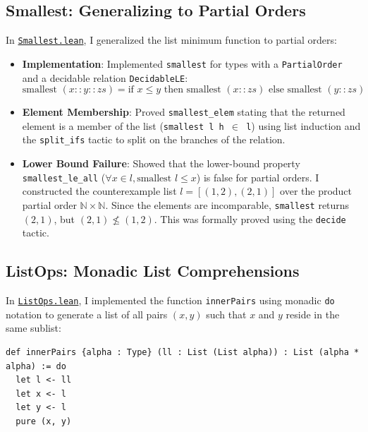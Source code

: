 \documentclass{article}
\begin{document}
\subsection{Smallest: Generalizing to Partial Orders}
In \href{file:///home/scorzion/Tech/Crypto/SKC_IITH/Day9/solutions/Smallest.lean}{\texttt{Smallest.lean}}, I generalized the list minimum function to partial orders:
\begin{itemize}
    \item \textbf{Implementation}: Implemented \texttt{smallest} for types with a \texttt{PartialOrder} and a decidable relation \texttt{DecidableLE}:
    \[
    \text{smallest } (x :: y :: zs) = \text{if } x \le y \text{ then } \text{smallest } (x :: zs) \text{ else } \text{smallest } (y :: zs)
    \]
    \item \textbf{Element Membership}: Proved \texttt{smallest\_elem} stating that the returned element is a member of the list (\texttt{smallest l h $\in$ l}) using list induction and the \texttt{split\_ifs} tactic to split on the branches of the relation.
    \item \textbf{Lower Bound Failure}: Showed that the lower-bound property \texttt{smallest\_le\_all} ($\forall x \in l, \text{smallest } l \le x$) is false for partial orders. I constructed the counterexample list $l = [(1, 2), (2, 1)]$ over the product partial order $\mathbb{N} \times \mathbb{N}$. Since the elements are incomparable, \texttt{smallest} returns $(2, 1)$, but $(2, 1) \not\le (1, 2)$. This was formally proved using the \texttt{decide} tactic.
\end{itemize}

\subsection{ListOps: Monadic List Comprehensions}
In \href{file:///home/scorzion/Tech/Crypto/SKC_IITH/Day9/solutions/ListOps.lean}{\texttt{ListOps.lean}}, I implemented the function \texttt{innerPairs} using monadic \texttt{do} notation to generate a list of all pairs $(x, y)$ such that $x$ and $y$ reside in the same sublist:
\begin{verbatim}
def innerPairs {alpha : Type} (ll : List (List alpha)) : List (alpha * alpha) := do
  let l <- ll
  let x <- l
  let y <- l
  pure (x, y)
\end{verbatim}
\end{document}
